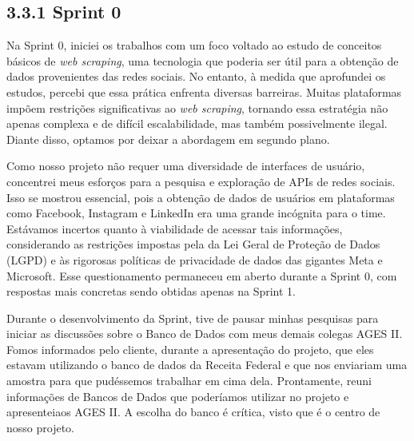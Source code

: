 \hypertarget{__RefHeading___Toc4785_3118176633}{}
\subsection*{3.3.1 Sprint 0}
\label{unit:ages-ii-sprint-0}

\indent \originaltab{}Na Sprint 0, iniciei os trabalhos com um foco voltado ao estudo de conceitos básicos de \textit{web scraping}, uma tecnologia que poderia ser útil para a obtenção de dados provenientes das redes sociais. No entanto, à medida que aprofundei os estudos, percebi que essa prática enfrenta diversas barreiras. Muitas plataformas impõem restrições significativas ao \textit{web scraping}, tornando essa estratégia não apenas complexa e de difícil escalabilidade, mas também possivelmente ilegal. Diante disso, optamos por deixar a abordagem em segundo plano.\par

\indent \originaltab{}Como nosso projeto não requer uma diversidade de interfaces de usuário, concentrei meus esforços para a pesquisa e exploração de APIs de redes sociais. Isso se mostrou essencial, pois a obtenção de dados de usuários em plataformas como Facebook, Instagram e LinkedIn era uma grande incógnita para o time. Estávamos incertos quanto à viabilidade de acessar tais informações, considerando as restrições impostas pela da Lei Geral de Proteção de Dados (LGPD) e às rigorosas políticas de privacidade de dados das gigantes Meta e Microsoft. Esse questionamento permaneceu em aberto durante a Sprint 0, com respostas mais concretas sendo obtidas apenas na Sprint 1.\par

\indent \originaltab{}Durante o desenvolvimento da Sprint, tive de pausar minhas pesquisas para iniciar as discussões sobre o Banco de Dados com meus demais colegas AGES II. Fomos informados pelo cliente, durante a apresentação do projeto, que eles estavam utilizando o banco de dados da Receita Federal e que nos enviariam uma amostra para que pudéssemos trabalhar em cima dela. Prontamente, reuni informações de Bancos de Dados que poderíamos utilizar no projeto e apresentei\originalspace{}\originalspace{}aos AGES II. A escolha do banco é crítica, visto que é o centro de nosso projeto.\originalspace{}\par


